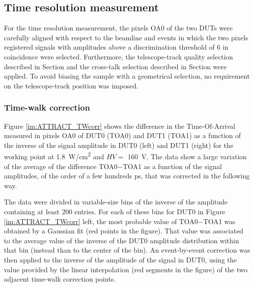 		\subsection{Time resolution measurement}
		For the time resolution measurement, the pixels OA0 of the two DUTs were carefully aligned with respect to the beamline and events in which the two pixels registered signals with amplitudes above a discrimination threshold of $ 6$ \noise in coincidence were selected. Furthermore, the telescope-track quality selection described in Section  and the cross-talk selection described in Section  were applied. To avoid biasing the sample with a geometrical selection, no requirement on the telescope-track position was imposed.



		\subsubsection{Time-walk correction} 
		Figure \ref{im:ATTRACT_TWcorr} shows the difference in the Time-Of-Arrival measured in pixels OA0 of  DUT0 (TOA0) and DUT1 (TOA1) as a function of the inverse of the signal amplitude in DUT0 (left) and DUT1 (right) for the working point at \SI{1.8}{\watt/\centi\meter^2} and $ HV =$ \SI{160}{\volt}. The data show a large variation of the average of the difference  TOA0$-$TOA1  as a function of the signal amplitudes, of the order of a few hundreds ps, that was corrected in the following way. 
	
		The data were divided in variable-size bins of the inverse of the amplitude containing at least 200 entries. For each of these bins for DUT0 in Figure \ref{im:ATTRACT_TWcorr} left, the most probable value of TOA0$-$TOA1 was obtained by a Gaussian fit (red points in the figure). That value was associated to the average value of the inverse of the DUT0 amplitude distribution within that bin (instead than to the center of the bin). An event-by-event correction was then applied to the inverse of the amplitude of the  signal in DUT0, using the value provided by the linear interpolation (red segments in the figure) of the two adjacent time-walk correction points.
		
